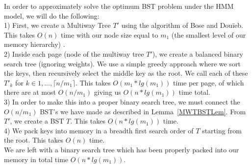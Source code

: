 \documentclass[letterpaper,12pt,titlepage,oneside,final]{book}
\theoremstyle{plain}
\begin{document}
In order to approximately solve the optimum BST problem under the HMM model, we will do the following: \\

1) First, we create a Multiway Tree $T'$ using the algorithm of Bose and Dou\"{i}eb. This takes $O(n)$ time with our node size equal to $m_1$ (the smallest level of our memory hierarchy) \cite{bose2009efficient}. \\

2) Inside each page (node of the multiway tree $T'$), we create a balanced binary search tree (ignoring weights). We use a simple greedy approach where we sort the keys, then recursively select the middle key as the root.  We call each of these $T'_k$ for $k \in {1,...,\lceil n/m_1 \rceil}$. This takes $O(m_1*lg(m_1))$ time per page, of which there are at most $O(n/m_1)$ giving us $O(n*lg(m_1))$ time total. \\

3) In order to make this into a proper binary search tree, we must connect the $O(n/m_1)$ BST's we have made as described in Lemma~\ref{MWTBSTLem}. From $T'$, we create a BST $T$. This takes $O(n*lg(m_1))$ time. \\

4) We pack keys into memory in a breadth first search order of $T$ starting from the root. This takes $O(n)$ time. \\

We are left with a binary search tree which has been properly packed into our memory in total time $O(n*lg(m_1))$.
\end{document}
